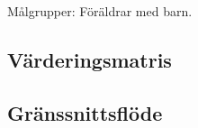 \documentclass[a4paper,12pt,titlepage]{article}
\begin{document}
Målgrupper: Föräldrar med barn.

\subsection*{Värderingsmatris}

\subsection*{Gränssnittsflöde}
\end{document}
